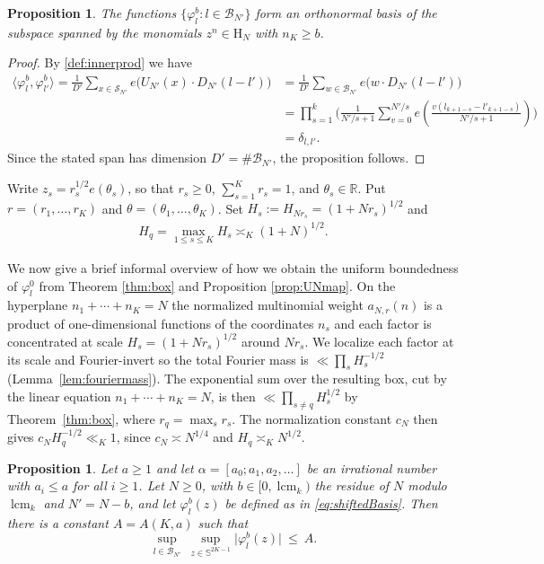 \documentclass[a4paper,reqno,12pt]{amsart}
\theoremstyle{plain}
\newtheorem{proposition}[theorem]{Proposition}
\theoremstyle{plain}
\theoremstyle{remark}
\theoremstyle{plain}
\newcommand{\B}{\mathscr{B}}
\newcommand{\PolySpace}{\mathrm{H}}
\newcommand{\cS}{\mathscr{S}}
\newcommand{\RR}{\mathbb{R}}
\newcommand{\p}{\varphi}
\newcommand{\Sphere}{\mathbb{S}}
\newcommand{\lcmk}{\operatorname{lcm}_k}
\theoremstyle{plain}
\theoremstyle{plain}
\begin{document}
{\begin{proposition}\label{prop:shiftedONS}
The functions $\{\p^b_{l}:l\in\B_{N'}\}$ form an orthonormal basis of the 
subspace spanned by the monomials $z^n \in {\PolySpace_N}$ with
$n_K\ge b$.
\end{proposition}

\begin{proof}
By \eqref{def:innerprod} we have
\begin{align*}
\langle\p^b_{l},\p^b_{l'}\rangle
=\frac1{D'}
\sum_{x\in\cS_{N'}}
e\bigl(U_{N'}(x)\cdot D_{N'}(l-l')\bigr)
& =\frac1{D'}\sum_{w\in\B_{N'}}
e\bigl(w\cdot D_{N'}(l-l')\bigr) \\
& = \prod_{s=1}^k \Biggl(  \frac{1}{{N'}/s+1}\sum_{v=0}^{{N'}/s} e\left(\frac{v (l_{k+1-s}-l'_{k+1-s})}{{N'}/s+1} \right)\Biggr)
\\ & =\delta_{l,l'}.
\end{align*}
Since the stated span has dimension $D'=\# \B_{N'}$, the proposition follows.
\end{proof}

Write $z_s=r_s^{1/2}e(\theta_s)$, so that $r_s\geq0$, $\sum_{s=1}^Kr_s=1$,
and $\theta_s \in \RR$. Put $r=(r_1,\ldots,r_K)$ and $\theta=(\theta_1,\ldots,\theta_K)$. 
Set $H_s:=H_{Nr_s}=(1+Nr_s)^{1/2}$ and
\begin{align}
H_q=\max_{1\le s\le K} H_s\asymp_K {(1+N)^{1/2}}.
\label{eq:largestScale}
\end{align}

We now give a brief informal overview {of} how we obtain the uniform boundedness of $\p^0_{l}$ from Theorem \ref{thm:box} and Proposition \ref{prop:UNmap}. On the hyperplane $n_1+\cdots+n_K=N$ {the} normalized multinomial weight
$a_{N,r}(n)$ is a product of one-dimensional
functions of the coordinates $n_s$ and each
factor is concentrated at scale $H_s=(1+Nr_s)^{1/2}$ around $Nr_s$.
We localize each factor at its scale and Fourier-invert so the total
Fourier mass is $\ll\prod_sH_s^{-1/2}$ (Lemma~\ref{lem:fouriermass}).
The exponential sum over the resulting box, cut by the linear
equation $n_1 + \cdots + n_K = N$, is then $\ll\prod_{s\ne q}H_s^{1/2}$ by
Theorem~\ref{thm:box}, where $r_q=\max_s r_s$. The normalization
constant $c_N$ then gives
$c_NH_q^{-1/2}\ll_K1$, since
$c_N\asymp N^{1/4}$ and $H_q\asymp_K N^{1/2}$.

\begin{proposition}\label{prop:shiftedbound}
Let $a\ge1$ and let $\alpha=[a_0;a_1,a_2,\ldots]$ be an irrational number
with $a_i\le a$ for all $i\ge1$.  Let $N\ge0$, with $b \in [0, \lcmk)$ the residue of $N$ modulo $\lcmk$ and $N'=N-b$, and let $\p^b_{l}(z)$ be defined as in \eqref{eq:shiftedBasis}. Then there is a constant $A=A(K,a)$ such that
\[
  \sup_{l\in\B_{N'}}\ \sup_{z\in\Sphere^{2K-1}}
  \bigl|\p^b_{l}(z)\bigr|\ \le\ A.
\]
\end{proposition}

}
\end{document}

